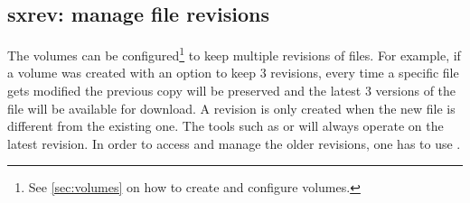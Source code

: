 \subsection{sxrev: manage file revisions}
The \SX volumes can be configured\footnote{See
{\ifpdf{}\else\ref{sec:volumes}\fi} on how
to create and configure volumes.} to keep multiple revisions of files. For
example, if a volume was created with an option to keep 3 revisions, every
time a specific file gets modified the previous copy will be preserved and
the latest 3 versions of the file will be available for download. A revision
is only created when the new file is different from the existing one.
The tools such as  or  will always operate on the latest
revision.  In order to access and manage the older revisions, one has to
use .

